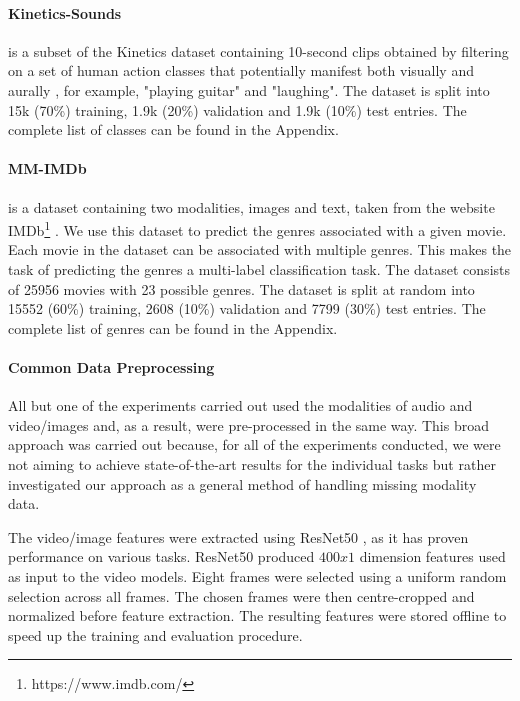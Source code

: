 \paragraph{\textbf{Kinetics-Sounds}} is a subset of the Kinetics \cite{kinetics} dataset containing 10-second clips obtained by filtering on a set of human action classes that potentially manifest both visually and aurally \cite{kinetics_sounds}, for example, "playing guitar" and "laughing". The dataset is split into 15k (70\%) training, 1.9k (20\%) validation and 1.9k (10\%) test entries. The complete list of classes can be found in the Appendix.


\paragraph{\textbf{MM-IMDb}} is a dataset containing two modalities, images and text, taken from the website IMDb\footnote{https://www.imdb.com/} \cite{arevalo2017gated}. We use this dataset to predict the genres associated with a given movie. Each movie in the dataset can be associated with multiple genres. This makes the task of predicting the genres a multi-label classification task. The dataset consists of 25956 movies with 23 possible genres. The dataset is split at random into 15552 (60\%) training, 2608 (10\%) validation and 7799 (30\%) test entries. The complete list of genres can be found in the Appendix.

\paragraph{\textbf{Common Data Preprocessing}}
All but one of the experiments carried out used the modalities of audio and video/images and, as a result, were pre-processed in the same way. This broad approach was carried out because, for all of the experiments conducted, we were not aiming to achieve state-of-the-art results for the individual tasks but rather investigated our approach as a general method of handling missing modality data. 

The video/image features were extracted using ResNet50 \cite{he2015deep}, as it has proven performance on various tasks. ResNet50 produced $400x1$ dimension features used as input to the video models. Eight frames were selected using a uniform random selection across all frames. The chosen frames were then centre-cropped and normalized before feature extraction. The resulting features were stored offline to speed up the training and evaluation procedure. 

